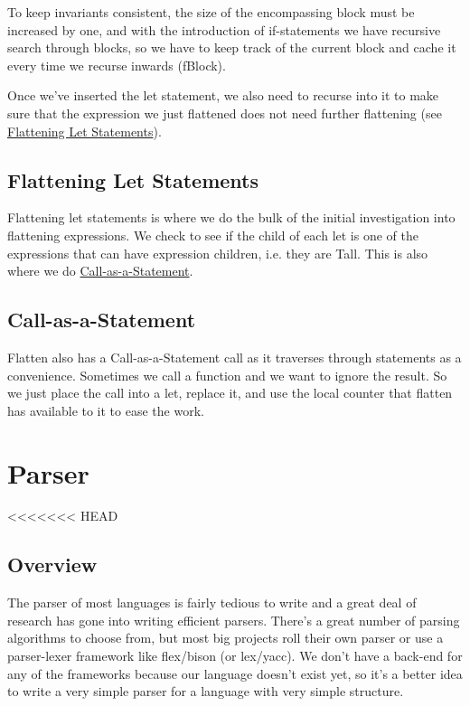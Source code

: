 \documentclass[journal=jacsat, manuscript=article]{achemso}
\begin{document}
To keep invariants consistent, the size of the encompassing block must be increased by one,
and with the introduction of if-statements we have recursive search through blocks, so we
have to keep track of the current block and cache it every time we recurse inwards
(fBlock).

Once we've inserted the let statement, we also need to recurse into it to make sure that
the expression we just flattened does not need further flattening 
(see \hyperref[sec:Flattening Let Statements]{Flattening Let Statements}).

\subsection{Flattening Let Statements}

Flattening let statements is where we do the bulk of the initial investigation into flattening
expressions. We check to see if the child of each let is one of the expressions that can have
expression children, i.e. they are Tall. This is also where we do \hyperref[sec:Call-as-a-Statement]{Call-as-a-Statement}.

\subsection{Call-as-a-Statement}

Flatten also has a Call-as-a-Statement call as it traverses through statements as a
convenience. Sometimes we call a function and we want to ignore the result. So we just
place the call into a let, replace it, and use the local counter that flatten has available to
it to ease the work.

\section{Parser}

<<<<<<< HEAD
\subsection{Overview}

The parser of most languages is fairly tedious to write and a great deal of research has
gone into writing efficient parsers. There's a great number of parsing algorithms to choose
from, but most big projects roll their own parser or use a parser-lexer framework like
flex/bison (or lex/yacc). We don't have a back-end for any of the frameworks because our
language doesn't exist yet, so it's a better idea to write a very simple parser for a language
with very simple structure.
\end{document}
